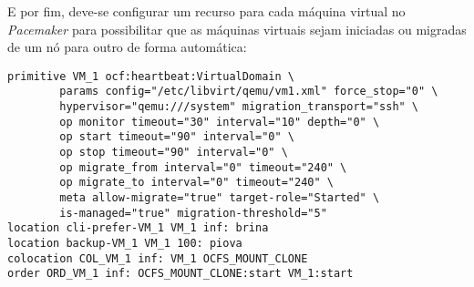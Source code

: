 E por fim, deve-se configurar um recurso para cada máquina virtual no \textit{Pacemaker} para possibilitar que as máquinas virtuais sejam 
iniciadas ou migradas de um nó para outro de forma automática: 
\begin{lstlisting}
primitive VM_1 ocf:heartbeat:VirtualDomain \
        params config="/etc/libvirt/qemu/vm1.xml" force_stop="0" \
        hypervisor="qemu:///system" migration_transport="ssh" \
        op monitor timeout="30" interval="10" depth="0" \
        op start timeout="90" interval="0" \
        op stop timeout="90" interval="0" \
        op migrate_from interval="0" timeout="240" \
        op migrate_to interval="0" timeout="240" \
        meta allow-migrate="true" target-role="Started" \
        is-managed="true" migration-threshold="5"
location cli-prefer-VM_1 VM_1 inf: brina
location backup-VM_1 VM_1 100: piova
colocation COL_VM_1 inf: VM_1 OCFS_MOUNT_CLONE
order ORD_VM_1 inf: OCFS_MOUNT_CLONE:start VM_1:start
\end{lstlisting}
